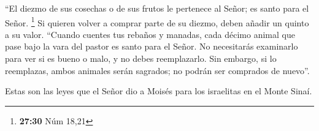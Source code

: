  ``El diezmo de sus cosechas o de sus frutos le pertenece
al Señor; es santo para el Señor. \footnote{\textbf{27:30} Núm 18,21}
 Si quieren volver a comprar parte de su diezmo, deben
añadir un quinto a su valor.  ``Cuando cuentes tus
rebaños y manadas, cada décimo animal que pase bajo la vara del pastor
es santo para el Señor.  No necesitarás examinarlo para
ver si es bueno o malo, y no debes reemplazarlo. Sin embargo, si lo
reemplazas, ambos animales serán sagrados; no podrán ser comprados de
nuevo''.

 Estas son las leyes que el Señor dio a Moisés para los
israelitas en el Monte Sinaí.
